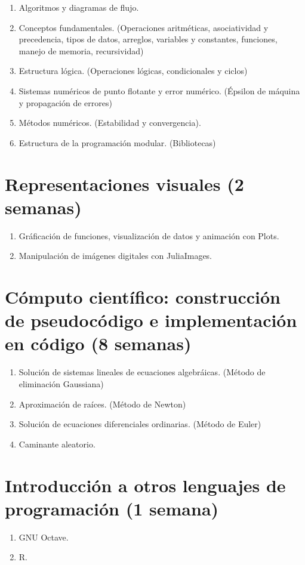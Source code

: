 \documentclass[a4paper]{article}
\begin{document}
\begin{enumerate}[label=\arabic*.]

    \item Algoritmos y diagramas de flujo.
    \item Conceptos fundamentales. (Operaciones aritméticas, asociatividad y precedencia, tipos de datos, arreglos, variables y constantes, funciones, manejo de memoria, recursividad)
    \item Estructura lógica. (Operaciones lógicas, condicionales y ciclos)
    \item Sistemas numéricos de punto flotante y error numérico. (Épsilon de máquina y propagación de errores)
    \item Métodos numéricos. (Estabilidad y convergencia).
    \item Estructura de la programación modular. (Bibliotecas)
\end{enumerate}

\section{Representaciones visuales (2 semanas)} \label{Sec: Representaciones visuales (2 semanas)}

\begin{enumerate}[label=\arabic*.]

    \item Gráficación de funciones, visualización de datos y animación con Plots.
    \item Manipulación de imágenes digitales con JuliaImages.
\end{enumerate}

\section{Cómputo científico: construcción de pseudocódigo e implementación en código (8 semanas)} \label{Sec: Cómputo científico: construcción de pseudocódigo e implementación en código (8 semanas)}

\begin{enumerate}[label=\arabic*.]

    \item Solución de sistemas lineales de ecuaciones algebráicas. (Método de eliminación Gaussiana)
    \item Aproximación de raíces. (Método de Newton)
    \item Solución de ecuaciones diferenciales ordinarias. (Método de Euler)
    \item Caminante aleatorio.
\end{enumerate}

\section{Introducción a otros lenguajes de programación (1 semana)} \label{Sec: Introducción a otros lenguajes de programación (1 semana)}

\begin{enumerate}[label=\arabic*.]

    \item GNU Octave.
    \item R.
\end{enumerate}
\end{document}
